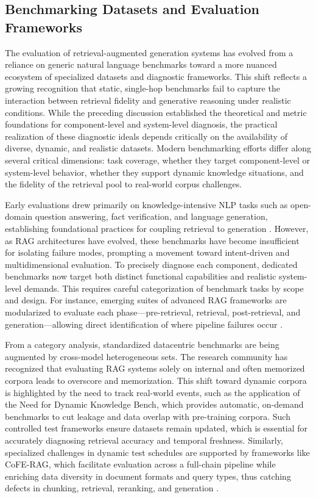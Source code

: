 \documentclass[11pt,a4paper]{article}
\begin{document}
\subsection{Benchmarking Datasets and Evaluation Frameworks}


The evaluation of retrieval-augmented generation systems has evolved from a reliance on generic natural language benchmarks toward a more nuanced ecosystem of specialized datasets and diagnostic frameworks. This shift reflects a growing recognition that static, single-hop benchmarks fail to capture the interaction between retrieval fidelity and generative reasoning under realistic conditions. While the preceding discussion established the theoretical and metric foundations for component-level and system-level diagnosis, the practical realization of these diagnostic ideals depends critically on the availability of diverse, dynamic, and realistic datasets. Modern benchmarking efforts differ along several critical dimensions: task coverage, whether they target component-level or system-level behavior, whether they support dynamic knowledge situations, and the fidelity of the retrieval pool to real-world corpus challenges.

Early evaluations drew primarily on knowledge-intensive NLP tasks such as open-domain question answering, fact verification, and language generation, establishing foundational practices for coupling retrieval to generation \cite{arxiv:2005.11401v4}. However, as RAG architectures have evolved, these benchmarks have become insufficient for isolating failure modes, prompting a movement toward intent-driven and multidimensional evaluation. To precisely diagnose each component, dedicated benchmarks now target both distinct functional capabilities and realistic system-level demands. This requires careful categorization of benchmark tasks by scope and design. For instance, emerging suites of advanced RAG frameworks are modularized to evaluate each phase---pre-retrieval, retrieval, post-retrieval, and generation---allowing direct identification of where pipeline failures occur \cite{arxiv:2412.15529v4}.

From a category analysis, standardized datacentric benchmarks are being augmented by cross-model heterogeneous sets. The research community has recognized that evaluating RAG systems solely on internal and often memorized corpora leads to overscore and memorization. This shift toward dynamic corpora is highlighted by the need to track real-world events, such as the application of the Need for Dynamic Knowledge Bench, which provides automatic, on-demand benchmarks to cut leakage and data overlap with pre-training corpora. Such controlled test frameworks ensure datasets remain updated, which is essential for accurately diagnosing retrieval accuracy and temporal freshness. Similarly, specialized challenges in dynamic test schedules are supported by frameworks like CoFE-RAG, which facilitate evaluation across a full-chain pipeline while enriching data diversity in document formats and query types, thus catching defects in chunking, retrieval, reranking, and generation \cite{arxiv:2410.12248v1}.
\end{document}
